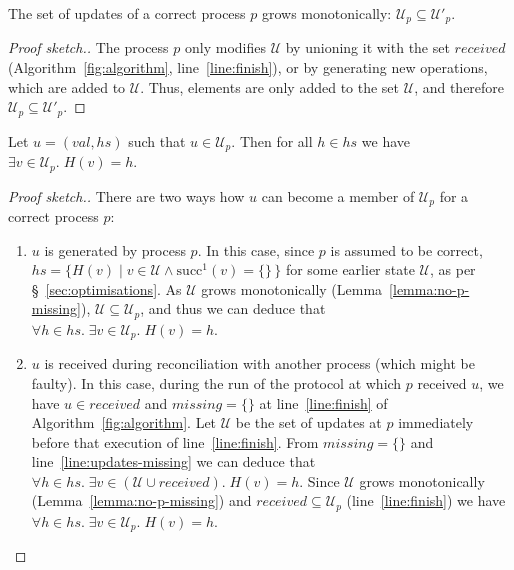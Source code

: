 \documentclass[a4paper,anonymous,USenglish]{lipics-v2019}
\begin{document}
\begin{lemma}\label{lemma:no-p-missing}
The set of updates of a correct process $p$ grows monotonically: $\mathcal{U}_p \subseteq \mathcal{U}'_p$.
\end{lemma}
\begin{proof}[Proof sketch.]
The process $p$ only modifies $\mathcal{U}$ by unioning it with the set $\mathit{received}$ (Algorithm~\ref{fig:algorithm}, line~\ref{line:finish}), or by generating new operations, which are added to $\mathcal{U}$.
Thus, elements are only added to the set $\mathcal{U}$, and therefore $\mathcal{U}_p \subseteq \mathcal{U}'_p$.
\end{proof}

\begin{lemma}\label{lemma:no-dangling}
Let $u = (\mathit{val}, \mathit{hs})$ such that $u \in \mathcal{U}_p$.
Then for all $h \in \mathit{hs}$ we have $\exists v \in \mathcal{U}_p.\; H(v) = h$.
\end{lemma}
\begin{proof}[Proof sketch.]
There are two ways how $u$ can become a member of $\mathcal{U}_p$ for a correct process $p$:
\begin{enumerate}
    \item $u$ is generated by process $p$.
    In this case, since $p$ is assumed to be correct, $\mathit{hs} = \{H(v) \mid v \in \mathcal{U} \wedge \mathrm{succ}^1(v) = \{\}\,\}$ for some earlier state $\mathcal{U}$, as per \S~\ref{sec:optimisations}.
    As $\mathcal{U}$ grows monotonically (Lemma~\ref{lemma:no-p-missing}), $\mathcal{U} \subseteq \mathcal{U}_p$, and thus we can deduce that $\forall h \in \mathit{hs}.\; \exists v \in \mathcal{U}_p.\; H(v) = h$.
    \item $u$ is received during reconciliation with another process (which might be faulty).
    In this case, during the run of the protocol at which $p$ received $u$, we have $u \in \mathit{received}$ and $\mathit{missing} = \{\}$ at line~\ref{line:finish} of Algorithm~\ref{fig:algorithm}.
    Let $\mathcal{U}$ be the set of updates at $p$ immediately before that execution of line~\ref{line:finish}.
    From $\mathit{missing} = \{\}$ and line~\ref{line:updates-missing} we can deduce that $\forall h \in \mathit{hs}.\; \exists v \in (\mathcal{U} \cup \mathit{received}).\; H(v) = h$.
    Since $\mathcal{U}$ grows monotonically (Lemma~\ref{lemma:no-p-missing}) and $\mathit{received} \subseteq \mathcal{U}_p$ (line~\ref{line:finish}) we have $\forall h \in \mathit{hs}.\; \exists v \in \mathcal{U}_p.\; H(v) = h$.
\end{enumerate}
\end{proof}
\end{document}
